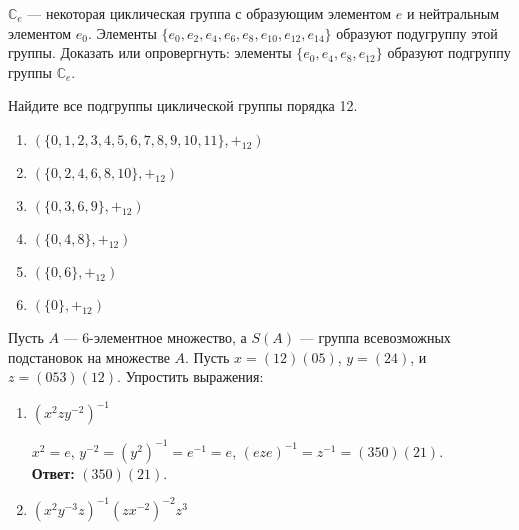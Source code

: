 \begin{task}
    $\mathbb{C}_e$ — некоторая циклическая группа с образующим элементом $e$ и нейтральным элементом $e_0$. Элементы $\{e_0,e_2,e_4,e_6,e_8,e_{10},e_{12},e_{14}\}$ образуют подугруппу этой группы. Доказать или опровергнуть: элементы $\{e_0, e_4, e_8, e_{12}\}$ образуют подгруппу группы $\mathbb{C}_e$.
\end{task}

\begin{task}
    Найдите все подгруппы циклической группы порядка 12.

    \begin{solution}
        \begin{enumerate}
            \item $(\{ 0, 1, 2, 3, 4, 5, 6, 7, 8, 9, 10, 11\}, +_{12})$
            \item $(\{ 0, 2, 4, 6, 8, 10\}, +_{12})$
            \item $(\{ 0, 3, 6, 9\}, +_{12})$
            \item $(\{ 0, 4, 8 \}, +_{12})$
            \item $(\{ 0, 6 \}, +_{12})$
            \item $(\{ 0 \}, +_{12})$
        \end{enumerate}
    \end{solution}
\end{task}

\begin{task}
    Пусть $A$ --- 6-элементное множество, а $S(A)$ --- группа всевозможных подстановок на множестве $A$. Пусть $x=(12)(05)$, $y=(24)$, и $z=(053)(12)$. Упростить выражения:
    \begin{enumerate}
        \item $(x^2 z y^{-2})^{-1}$\\
        \begin{solution}
            $x^2=e$, $y^{-2}=(y^2)^{-1}=e^{-1}=e$, $(e z e)^{-1}=z^{-1}=(350)(21)$.\\ \textbf{Ответ:} $(350)(21)$.
        \end{solution}
        \item $(x^2 y^{-3} z)^{-1} (z x^{-2})^{-2} z^3$
    \end{enumerate}
\end{task}

